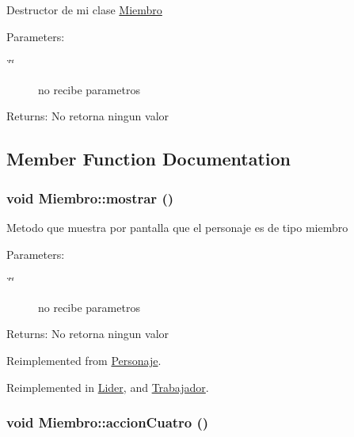 Destructor de mi clase \hyperlink{classMiembro}{Miembro} \begin{Desc}
\item[Parameters:]
\begin{description}
\item[{\em \char`\"{}\char`\"{}}]no recibe parametros \end{description}
\end{Desc}
\begin{Desc}
\item[Returns:]No retorna ningun valor \end{Desc}


\subsection{Member Function Documentation}
\hypertarget{classMiembro_28498c7229e81e64d0cb7ea69515dca0}{
\subsubsection[mostrar]{\setlength{\rightskip}{0pt plus 5cm}void Miembro::mostrar ()}}
\label{classMiembro_28498c7229e81e64d0cb7ea69515dca0}


Metodo que muestra por pantalla que el personaje es de tipo miembro \begin{Desc}
\item[Parameters:]
\begin{description}
\item[{\em \char`\"{}\char`\"{}}]no recibe parametros \end{description}
\end{Desc}
\begin{Desc}
\item[Returns:]No retorna ningun valor \end{Desc}


Reimplemented from \hyperlink{classPersonaje_e9f6bd8027b8a5c2e660a327d9e513ca}{Personaje}.

Reimplemented in \hyperlink{classLider_125acbb3a1432f217efdc9826a2b8d8f}{Lider}, and \hyperlink{classTrabajador_49e5a94181d6a517d9f5213335da1e27}{Trabajador}.\hypertarget{classMiembro_b286484cab275d7754c6ce2b513fdc9a}{
\subsubsection[accionCuatro]{\setlength{\rightskip}{0pt plus 5cm}void Miembro::accionCuatro ()}}
\label{classMiembro_b286484cab275d7754c6ce2b513fdc9a}


